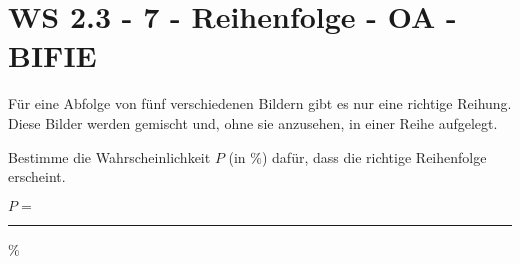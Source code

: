 \section{WS 2.3 - 7 - Reihenfolge - OA - BIFIE}

\begin{beispiel}[WS 2.3]{1}
Für eine Abfolge von fünf verschiedenen Bildern gibt es nur eine richtige Reihung. Diese Bilder werden gemischt und, ohne sie anzusehen, in einer Reihe aufgelegt.

Bestimme die Wahrscheinlichkeit $P$ (in \%) dafür, dass die richtige Reihenfolge erscheint. \leer

$P=$\rule{4cm}{0.3pt}\%

\end{beispiel}